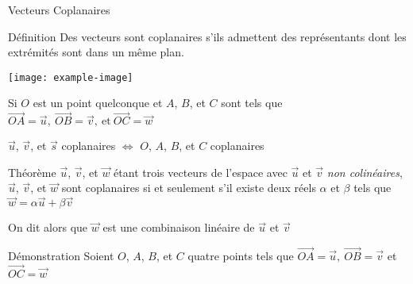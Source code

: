 \documentclass{cours}
\begin{document}
    \begin{Gpartie}{Vecteurs Coplanaires} 
        \begin{Spartie}{Définition} 
            Des vecteurs sont coplanaires s'ils admettent des représentants dont les extrémités sont dans un même plan.
            \begin{center}
                    \texttt{[image: example-image]}
                    \parbox{\linewidth}{}
            \end{center}
            Si $O$ est un point quelconque et $A$, $B$, et $C$ sont tels que $\overrightarrow{OA}=\vec{u},\ \overrightarrow{OB}=\vec{v},\ \text{et}\ \overrightarrow{OC}=\vec{w}$

            $\vec{u}$, $\vec{v}$, et $\vec{s}$ coplanaires $\iff$ $O$, $A$, $B$, et $C$ coplanaires
        \end{Spartie}
        \begin{Spartie}{Théorème} 
            $\vec{u}$, $\vec{v}$, et $\vec{w}$ étant trois vecteurs de l'espace avec $\vec{u}$ et $\vec{v}$ \emph{non colinéaires}, $\vec{u}$, $\vec{v}$, et $\vec{w}$ sont coplanaires si et seulement s'il existe deux réels $\alpha$ et $\beta$ tels que $\vec{w}=\alpha\vec{u}+\beta\vec{v}$
            
            On dit alors que $\vec{w}$ est une combinaison linéaire de $\vec{u}$ et $\vec{v}$
            \pagebreak
            \begin{SSpartie}{Démonstration} 
                Soient $O$, $A$, $B$, et $C$ quatre points tels que $\overrightarrow{OA}=\vec{u},\ \overrightarrow{OB}=\vec{v}$ et $\overrightarrow{OC}=\vec{w}$


\end{SSpartie}
\end{Spartie}
\end{Gpartie}
\end{document}
